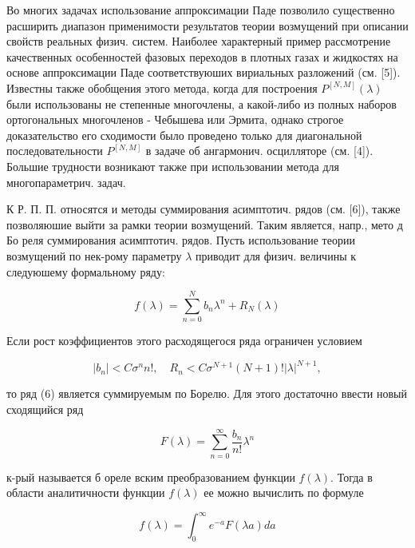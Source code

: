 \documentclass[10pt]{article}
\begin{document}
Во многих задачах использование аппроксимации Паде позволило существенно расширить диапазон применимости результатов теории возмущений при описании свойств реальных физич. систем. Наиболее характерный пример рассмотрение качественных особенностей фазовых переходов в плотных газах и жидкостях на основе аппроксимации Паде соответствуюших вириальных разложений (см. [5]). Известны также обобщения этого метода, когда для построения $P^{[N, M]}(\lambda)$ были использованы не степенные многочлены, а какой-либо из полных наборов ортогональных многочленов - Чебышева или Эрмита, однако строгое доказательство его сходимости было проведено только для диагональной последовательности $P^{[N, M]}$ в задаче об ангармонич. осцилляторе (см. [4]). Большие трудности возникают также при использовании метода для многопараметрич. задач.



К Р. П. П. относятся и методы суммирования асимптотич. рядов (см. [6]), также позволяюшие выйти за рамки теории возмущений. Таким является, напр., мето д Бо реля суммирования асимптотич. рядов. Пусть использование теории возмущений по нек-рому параметру $\lambda$ приводит для физич. величины к следуюшему формальному ряду:



\[

f(\lambda)=\sum_{n=0}^{N} b_{n} \lambda^{n}+R_{N}(\lambda)

\]



Если рост коэффициентов этого расходящегося ряда ограничен условием



\[

\left|b_{n}\right|<C \sigma^{n} n !, \quad R_{n}<C \sigma^{N+1}(N+1) !|\lambda|^{N+1},

\]



то ряд (6) является суммируемым по Борелю. Для этого достаточно ввести новый сходящийся ряд



\[

F(\lambda)=\sum_{n=0}^{\infty} \frac{b_{n}}{n !} \lambda^{n}

\]



к-рый называется б ореле вским преобразованием функции $f(\lambda)$. Тогда в области аналитичности функции $f(\lambda)$ ее можно вычислить по формуле



\[

f(\lambda)=\int_{0}^{\infty} e^{-a} F(\lambda a) d a

\]
\end{document}
